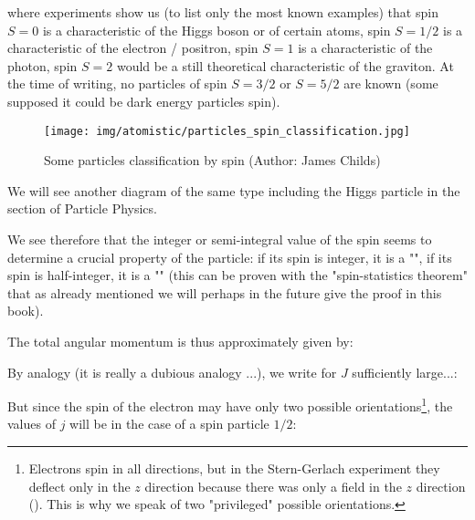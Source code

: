 	where experiments show us (to list only the most known examples) that spin $S=0$ is a characteristic of the Higgs boson or of certain atoms, spin $S=1/2$ is a characteristic of the electron / positron, spin $S=1$ is a characteristic of the photon, spin $S=2$ would be a still theoretical characteristic of the graviton. At the time of writing, no particles of spin $S=3/2$ or $S=5/2$ are known (some supposed it could be dark energy particles spin).
	\begin{figure}[H]
		\centering
		\texttt{[image: img/atomistic/particles\_spin\_classification.jpg]}	
		\caption{Some particles classification by spin (Author: James Childs)}
	\end{figure}
	We will see another diagram of the same type including the Higgs particle in the section of Particle Physics.
	
	We see therefore that the integer or semi-integral value of the spin seems to determine a crucial property of the particle: if its spin is integer, it is a "", if its spin is half-integer, it is a "" (this can be proven with the "spin-statistics theorem" that as already mentioned we will perhaps in the future give the proof in this book).
	
	The total angular momentum is thus approximately given by:
	
	By analogy (it is really a dubious analogy ...), we write for $J$ sufficiently large...:
	
	But since the spin of the electron may have only two possible orientations\footnote{Electrons spin in all directions, but in the Stern-Gerlach experiment they deflect only in the $z$ direction because there was only a field in the $z$ direction (). This is why we speak of two "privileged" possible orientations.}, the values of $j$ will be in the case of a spin particle $1/2$:
	
